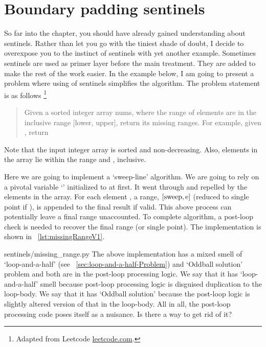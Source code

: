 \section{Boundary padding sentinels}\label{sec:boundaryPaddingSentinels}

So far into the chapter, you should have already gained understanding about sentinels.
Rather than let you go with the tiniest shade of doubt,
I decide to overexpose you to the instinct of sentinels with yet another example.
Sometimes sentinels are used as primer layer before the main treatment.
They are added to make the rest of the work easier.
In the example below, I am going to present a problem where using of sentinels simplifies the
algorithm.
The problem statement is as follows \footnote{Adapted from Leetcode \url{leetcode.com}.}
\begin{quote}
    Given a sorted integer array nums, where the range of elements are
    in the inclusive range [lower, upper], return its missing ranges.
    For example, given \code{[0, 1, 3, 50, 75]}, return \code{[2, (4,49), (51,74), (76,99)]}
\end{quote}
Note that the input integer array is sorted and non-decreasing.
Also, elements in the array lie within the range  and , inclusive.

Here we are going to implement a `sweep-line' algorithm.
We are going to rely on a pivotal variable `' initialized to  at first.
It went through and repelled by the elements in the array.
For each element , a range, $[\code{sweep}, \code{e}]$ (reduced to single point
 if ), is appended to the final result if valid.
This above process can potentially leave a final range unaccounted.
To complete algorithm, a post-loop check is needed to recover the final range (or single point).
The implementation is shown in ~\autoref{lst:missingRangeV1}.

{sentinels/missing_range.py}
The above implementation has a mixed smell of `loop-and-a-half'
(see ~\autoref{sec:loop-and-a-half-Problem}) and `Oddball solution' problem\@\cite{Fowler1999}
and both are in the post-loop processing logic.
We say that it has `loop-and-a-half' smell because post-loop processing logic is disguised
duplication to the loop-body.
We say that it has `Oddball solution' because the post-loop logic is slightly altered version of
that in the loop-body.
All in all, the post-loop processing code poses itself as a nuisance.
Is there a way to get rid of it?

